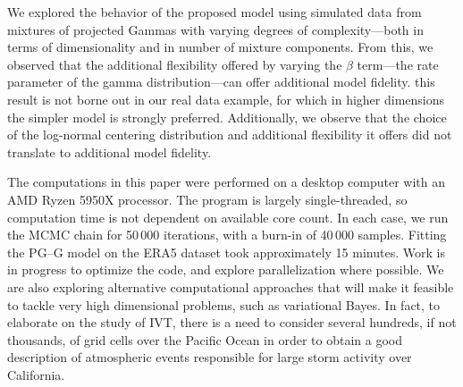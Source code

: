 We explored the behavior of the proposed model using simulated data from
    mixtures of projected Gammas with varying degrees of complexity---both 
    in terms of dimensionality and in number of mixture components.  From this,
    we observed that the additional flexibility offered by varying the $\beta$
    term---the rate parameter of the gamma distribution---can offer additional
    model fidelity.   this result is not borne out in our 
    real data example, for which in higher dimensions the simpler model is 
    strongly preferred.  Additionally, we observe
    that the choice of the log-normal centering distribution and additional
    flexibility it offers did not translate to additional model fidelity.  

The computations in this paper were performed on a desktop computer with an 
    AMD Ryzen 5950X processor. The program is largely single-threaded, so 
    computation time is not dependent on available core count.  In each case, 
    we run the MCMC chain for 50\,000 iterations, with a burn-in of 40\,000 
    samples.  Fitting the PG--G model on the ERA5 dataset took approximately 
    15 minutes.  Work is in progress to optimize the code, and explore 
    parallelization where possible.  We are also exploring alternative 
    computational approaches that will make it feasible to tackle very high 
    dimensional problems, such as variational Bayes. In fact, to elaborate on 
    the study of IVT, there is a need to consider several hundreds, if not thousands, 
    of grid cells over the Pacific Ocean in order to obtain a good description of 
    atmospheric  events responsible for large storm activity over California.  



